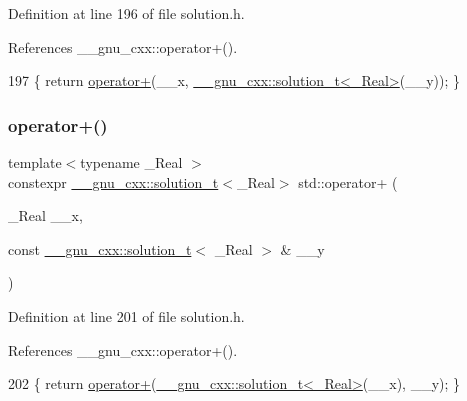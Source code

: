 Definition at line 196 of file solution.\+h.



References \+\_\+\+\_\+gnu\+\_\+cxx\+::operator+().


\begin{DoxyCode}
197     \{ \textcolor{keywordflow}{return} \hyperlink{namespacestd_aa471e6e6583f0beced389171490d8684}{operator+}(\_\_x, \hyperlink{namespace____gnu__cxx_ae20ea642de50eb361074c62676b0159c}{\_\_gnu\_cxx::solution\_t<\_Real>}(\_\_y)); \}
\end{DoxyCode}
\mbox{\label{namespacestd_a6f47cf71b7277a461d5627a46748abe1}} 
\subsubsection{\texorpdfstring{operator+()}{operator+()}\hspace{0.1cm}{\footnotesize\ttfamily [4/6]}}
{\footnotesize\ttfamily template$<$typename \+\_\+\+Real $>$ \\
constexpr \hyperlink{namespace____gnu__cxx_ae20ea642de50eb361074c62676b0159c}{\+\_\+\+\_\+gnu\+\_\+cxx\+::solution\+\_\+t}$<$\+\_\+\+Real$>$ std\+::operator+ (\begin{DoxyParamCaption}\item[{\+\_\+\+Real}]{\+\_\+\+\_\+x,  }\item[{const \hyperlink{namespace____gnu__cxx_ae20ea642de50eb361074c62676b0159c}{\+\_\+\+\_\+gnu\+\_\+cxx\+::solution\+\_\+t}$<$ \+\_\+\+Real $>$ \&}]{\+\_\+\+\_\+y }\end{DoxyParamCaption})}



Definition at line 201 of file solution.\+h.



References \+\_\+\+\_\+gnu\+\_\+cxx\+::operator+().


\begin{DoxyCode}
202     \{ \textcolor{keywordflow}{return} \hyperlink{namespacestd_aa471e6e6583f0beced389171490d8684}{operator+}(\hyperlink{namespace____gnu__cxx_ae20ea642de50eb361074c62676b0159c}{\_\_gnu\_cxx::solution\_t<\_Real>}(\_\_x), \_\_y); \}
\end{DoxyCode}
\mbox{\label{namespacestd_a7c7a048cefad54d71198cecef43ff7bd}} 

